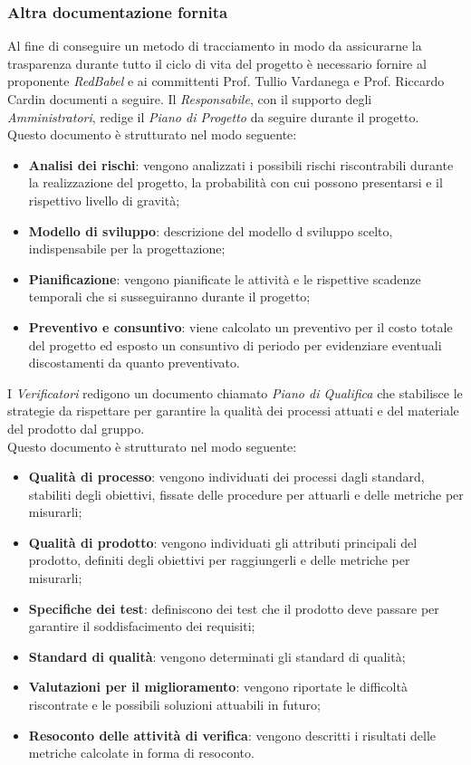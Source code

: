 \subsubsection{Altra documentazione fornita}
Al fine di conseguire un metodo di tracciamento in modo da assicurarne la trasparenza durante tutto il ciclo di vita del progetto è necessario fornire al proponente \textit{RedBabel} e ai committenti Prof. Tullio Vardanega e Prof. Riccardo Cardin documenti a seguire.
Il \textit{Responsabile}, con il supporto degli \textit{Amministratori}, redige il \textit{Piano di Progetto} da seguire durante il progetto.
\\Questo documento è strutturato nel modo seguente:
\begin{itemize}
    \item \textbf{Analisi dei rischi}: vengono analizzati i possibili rischi riscontrabili durante la realizzazione del progetto, la probabilità con cui possono presentarsi e il rispettivo livello di gravità;
    \item \textbf{Modello di sviluppo}: descrizione del modello d sviluppo scelto, indispensabile per la progettazione;
    \item \textbf{Pianificazione}: vengono pianificate le attività e le rispettive scadenze temporali che si susseguiranno durante il progetto;
    \item \textbf{Preventivo e consuntivo}: viene calcolato un preventivo per il costo totale del progetto ed esposto un consuntivo di periodo per evidenziare eventuali discostamenti da quanto preventivato. 
\end{itemize}
I \textit{Verificatori} redigono un documento chiamato \textit{Piano di Qualifica} che stabilisce le strategie da rispettare per garantire la qualità dei processi attuati e del materiale del prodotto dal gruppo. 
\\Questo documento è strutturato nel modo seguente:
\begin{itemize}
    \item \textbf{Qualità di processo}: vengono individuati dei processi dagli standard, stabiliti degli obiettivi, fissate delle procedure per attuarli e delle metriche per misurarli;
    \item \textbf{Qualità di prodotto}: vengono individuati gli attributi principali del prodotto, definiti degli obiettivi per raggiungerli e delle metriche per misurarli;
    \item \textbf{Specifiche dei test}: definiscono dei test che il prodotto deve passare per garantire il soddisfacimento dei requisiti;
    \item \textbf{Standard di qualità}: vengono determinati gli standard di qualità;
    \item \textbf{Valutazioni per il miglioramento}: vengono riportate le difficoltà riscontrate e le possibili soluzioni attuabili in futuro;
    \item \textbf{Resoconto delle attività di verifica}: vengono descritti i risultati delle metriche calcolate in forma di resoconto.
\end{itemize}
